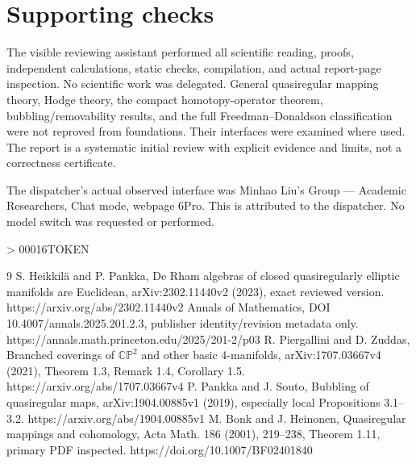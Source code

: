 \documentclass[10pt]{article}
\begin{document}
\section*{Supporting checks}
The visible reviewing assistant performed all scientific reading, proofs, independent calculations, static checks, compilation, and actual report-page inspection. No scientific work was delegated. General quasiregular mapping theory, Hodge theory, the compact homotopy-operator theorem, bubbling/removability results, and the full Freedman–Donaldson classification were not reproved from foundations. Their interfaces were examined where used. The report is a systematic initial review with explicit evidence and limits, not a correctness certificate.\par
The dispatcher’s actual observed interface was Minhao Liu’s Group — Academic Researchers, Chat mode, webpage 6Pro. This is attributed to the dispatcher. No model switch was requested or performed.\par
> 00016TOKEN\par
9 S. Heikkilä and P. Pankka, De Rham algebras of closed quasiregularly elliptic manifolds are Euclidean, arXiv:2302.11440v2 (2023), exact reviewed version. https://arxiv.org/abs/2302.11440v2 Annals of Mathematics, DOI 10.4007/annals.2025.201.2.3, publisher identity/revision metadata only. https://annals.math.princeton.edu/2025/201-2/p03 R. Piergallini and D. Zuddas, Branched coverings of \(\mathbb{CP}^2\) and other basic 4-manifolds, arXiv:1707.03667v4 (2021), Theorem 1.3, Remark 1.4, Corollary 1.5. https://arxiv.org/abs/1707.03667v4 P. Pankka and J. Souto, Bubbling of quasiregular maps, arXiv:1904.00885v1 (2019), especially local Propositions 3.1–3.2. https://arxiv.org/abs/1904.00885v1 M. Bonk and J. Heinonen, Quasiregular mappings and cohomology, Acta Math. 186 (2001), 219–238, Theorem 1.11, primary PDF inspected. https://doi.org/10.1007/BF02401840\par
\end{document}
